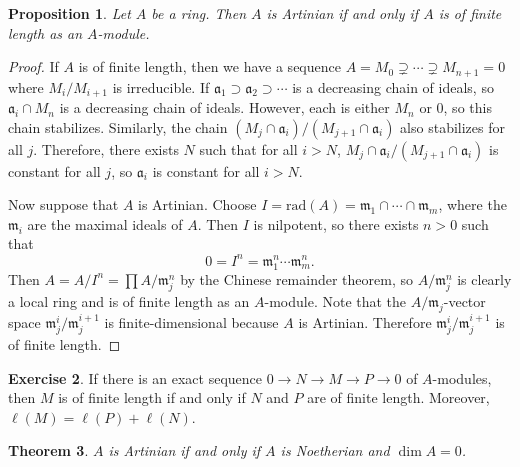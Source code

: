 \documentclass[leqno, openany]{memoir}
\newtheorem{thm}{Theorem}[section]
\newtheorem{prop}[thm]{Proposition}
\theoremstyle{definition}
\newtheorem{exer}[thm]{Exercise}
\theoremstyle{remark}
\theoremstyle{plain}
\theoremstyle{definition}
\theoremstyle{remark}
\newcommand{\mf}[1]{\mathfrak{#1}}
\newcommand{\mr}[1]{\mathrm{#1}}
\begin{document}
\begin{prop}
    Let $A$ be a ring. Then $A$ is Artinian if and only if $A$ is of finite length as an $A$-module.
\end{prop}

\begin{proof}
    If $A$ is of finite length, then we have a sequence $A = M_0 \supsetneq \cdots \supsetneq M_{n+1} = 0$ where $M_i / M_{i+1}$ is irreducible. If $\mf{a}_1 \supset \mf{a}_2 \supset \cdots$ is a decreasing chain of ideals, so $\mf{a}_i \cap M_n$ is a decreasing chain of ideals. However, each is either $M_n$ or $0$, so this chain stabilizes. Similarly, the chain $(M_j \cap \mf{a}_i) / (M_{j+1} \cap \mf{a}_i)$ also stabilizes for all $j$. Therefore, there exists $N$ such that for all $i > N$, $M_j \cap \mf{a}_i / (M_{j+1} \cap \mf{a}_i)$ is constant for all $j$, so $\mf{a}_i$ is constant for all $i > N$.

    Now suppose that $A$ is Artinian. Choose $I = \mr{rad}(A) = \mf{m}_1 \cap \cdots \cap \mf{m}_m$, where the $\mf{m}_i$ are the maximal ideals of $A$. Then $I$ is nilpotent, so there exists $n > 0$ such that
    \[ 0 = I^n = \mf{m}_1^n \cdots \mf{m}_m^n. \]
    Then $A = A / I^n = \prod A/ \mf{m}_j^n$ by the Chinese remainder theorem, so $A / \mf{m}_j^n$ is clearly a local ring and is of finite length as an $A$-module. Note that the $A/\mf{m}_j$-vector space $\mf{m}_j^i / \mf{m}_j^{i+1}$ is finite-dimensional because $A$ is Artinian. Therefore $\mf{m}_j^i / \mf{m}_j^{i+1}$ is of finite length.
\end{proof}

\begin{exer}
    If there is an exact sequence $0 \to N \to M \to P \to 0$ of $A$-modules, then $M$ is of finite length if and only if $N$ and $P$ are of finite length. Moreover, $\ell(M) = \ell(P) + \ell(N)$.
\end{exer}

\begin{thm}
    $A$ is Artinian if and only if $A$ is Noetherian and $\dim A = 0$.
\end{thm}
\end{document}
